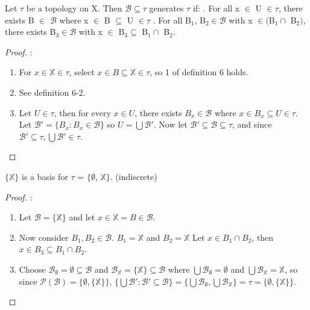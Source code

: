 \documentclass{article}
\begin{document}
	\begin{theorem}
	Let $\tau$ be a topology on X. Then $\mathcal{B} \subseteq \tau$ generates $\tau$ if:
	. For all x $\in$ U $\in \tau$, there exists B $\in$ $\mathcal{B}$ where x $\in$ B $\subseteq$ U $\in \tau$
	. For all B$_1$, B$_2 \in \mathcal{B}$ with x $\in ($B$_1 \cap$ B$_2)$, there exists B$_3 \in \mathcal{B}$ with x $\in$ B$_3 \subseteq$ B$_1 \cap$ B$_2$.
\end{theorem}
\begin{proof}:\newline
	\begin{enumerate}
		\item For $x \in \mathbb{X} \in \tau$, select $x \in B \subseteq \mathbb{X} \in \tau$, so 1 of definition 6 holds.
		\item See definition 6-2.
		\item Let $U \in \tau$, then for every $x \in U$, there exists $B_x \in \mathcal{B}$ where $x \in B_x \subseteq U \in \tau$. Let $\mathcal{B'} = \lbrace B_x : B_x \in \mathcal{B} \rbrace$ so $U = \bigcup \mathcal{B'}$. Now let $\mathcal{B'} \subseteq \mathcal{B} \subseteq \tau$, and since $\mathcal{B'} \subseteq \tau, \bigcup \mathcal{B'} \in \tau$.
		\end{enumerate}
\end{proof}

	\begin{theorem}
	$\lbrace\mathbb{X}\rbrace$ is a basis for $\tau$ = $\lbrace\emptyset$, $\mathbb{X}\rbrace$. (indiscrete)
	\end{theorem}
	\begin{proof}:\newline
	\begin{enumerate}
		\item Let $\mathcal{B} = \lbrace\mathbb{X}\rbrace$ and let $x \in \mathbb{X} = B \in \mathcal{B}$.
		\item Now consider $B_1, B_2 \in \mathcal{B}$. $B_1 = \mathbb{X}$ and $B_2 = \mathbb{X}$ Let $x \in B_1 \cap B_2$, then $x \in B_3 \subseteq B_1 \cap B_2$.
		\item Choose $\mathcal{B}_\emptyset = \emptyset \subseteq \mathcal{B}$ and $\mathcal{B}_\mathbb{X} = \lbrace \mathbb{X} \rbrace \subseteq \mathcal{B}$ where $\bigcup \mathcal{B}_\emptyset = \emptyset$ and $\bigcup \mathcal{B}_\mathbb{X} = \mathbb{X}$, so since $\mathcal{P}(\mathcal{B}) = \lbrace \emptyset, \lbrace \mathbb{X} \rbrace \rbrace$, $\lbrace \bigcup \mathcal{B'} : \mathcal{B'} \subseteq \mathcal{B} \rbrace = \lbrace \bigcup \mathcal{B}_\emptyset, \bigcup \mathcal{B}_\mathbb{X} \rbrace = \tau = \lbrace \emptyset, \lbrace \mathbb{X} \rbrace \rbrace$.
	\end{enumerate}
	\end{proof}
\end{document}
